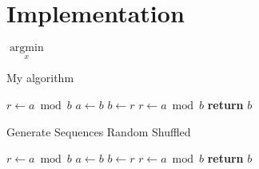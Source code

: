\section{Implementation}
\label{sec:implementation}

$\underset{x}{\operatorname{argmin}}$

\begin{algorithm}
  \caption{My algorithm}
  \begin{algorithmic}[1]
      \State $r\gets a\bmod b$
        \State $a\gets b$
        \State $b\gets r$
        \State $r\gets a\bmod b$
      \EndWhile\label{euclidendwhile}
      \State \textbf{return} $b$
    \EndProcedure

  \end{algorithmic}
\end{algorithm}

% 
% 

\begin{algorithm}
  \caption{Generate Sequences Random Shuffled}
  \begin{algorithmic}[1]
      \State $r\gets a\bmod b$
        \State $a\gets b$
        \State $b\gets r$
        \State $r\gets a\bmod b$
      \EndWhile
      \State \textbf{return} $b$
    \EndProcedure

  \end{algorithmic}
\end{algorithm}